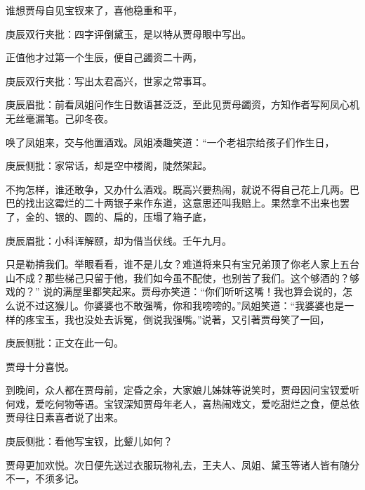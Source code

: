 \begin{parag}
    谁想贾母自见宝钗来了，喜他稳重和平，\begin{note}庚辰双行夹批：四字评倒黛玉，是以特从贾母眼中写出。\end{note}正值他才过第一个生辰，便自己蠲资二十两，\begin{note}庚辰双行夹批：写出太君高兴，世家之常事耳。\end{note}\begin{note}庚辰眉批：前看凤姐问作生日数语甚泛泛，至此见贾母蠲资，方知作者写阿凤心机无丝毫漏笔。己卯冬夜。\end{note}唤了凤姐来，交与他置酒戏。凤姐凑趣笑道：“一个老祖宗给孩子们作生日，\begin{note}庚辰侧批：家常话，却是空中楼阁，陡然架起。\end{note}不拘怎样，谁还敢争，又办什么酒戏。既高兴要热闹，就说不得自己花上几两。巴巴的找出这霉烂的二十两银子来作东道，这意思还叫我赔上。果然拿不出来也罢了，金的、银的、圆的、扁的，压塌了箱子底，\begin{note}庚辰眉批：小科诨解颐，却为借当伏线。壬午九月。\end{note}只是勒掯我们。举眼看看，谁不是儿女？难道将来只有宝兄弟顶了你老人家上五台山不成？那些梯己只留于他，我们如今虽不配使，也别苦了我们。这个够酒的？够戏的？” 说的满屋里都笑起来。贾母亦笑道：“你们听听这嘴！我也算会说的，怎么说不过这猴儿。你婆婆也不敢强嘴，你和我嗙嗙的。”凤姐笑道：“我婆婆也是一样的疼宝玉，我也没处去诉冤，倒说我强嘴。”说著，又引著贾母笑了一回，\begin{note}庚辰侧批：正文在此一句。\end{note}贾母十分喜悦。
\end{parag}


\begin{parag}
    到晚间，众人都在贾母前，定昏之余，大家娘儿姊妹等说笑时，贾母因问宝钗爱听何戏，爱吃何物等语。宝钗深知贾母年老人，喜热闹戏文，爱吃甜烂之食，便总依贾母往日素喜者说了出来。\begin{note}庚辰侧批：看他写宝钗，比颦儿如何？\end{note}贾母更加欢悦。次日便先送过衣服玩物礼去，王夫人、凤姐、黛玉等诸人皆有随分不一，不须多记。
\end{parag}


